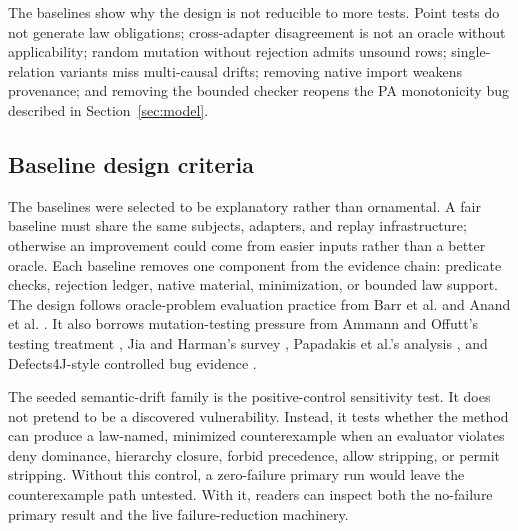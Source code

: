\documentclass[10pt,conference]{IEEEtran}
\begin{document}
The baselines show why the design is not reducible to more tests.  Point tests do not generate law obligations; cross-adapter disagreement is not an oracle without applicability; random mutation without rejection admits unsound rows; single-relation variants miss multi-causal drifts; removing native import weakens provenance; and removing the bounded checker reopens the PA monotonicity bug described in Section~\ref{sec:model}.


\subsection{Baseline design criteria}
The baselines were selected to be explanatory rather than ornamental.  A fair baseline must share the same subjects, adapters, and replay infrastructure; otherwise an improvement could come from easier inputs rather than a better oracle.  Each baseline removes one component from the evidence chain: predicate checks, rejection ledger, native material, minimization, or bounded law support.  The design follows oracle-problem evaluation practice from Barr et al. \cite{barr2015oracle} and Anand et al. \cite{anand2013orchestrated}.  It also borrows mutation-testing pressure from Ammann and Offutt's testing treatment \cite{ammann2016introduction}, Jia and Harman's survey \cite{jia2011mutation}, Papadakis et al.'s analysis \cite{papadakis2019mutation}, and Defects4J-style controlled bug evidence \cite{just2014mutants}.

The seeded semantic-drift family is the positive-control sensitivity test.  It does not pretend to be a discovered vulnerability.  Instead, it tests whether the method can produce a law-named, minimized counterexample when an evaluator violates deny dominance, hierarchy closure, forbid precedence, allow stripping, or permit stripping.  Without this control, a zero-failure primary run would leave the counterexample path untested.  With it, readers can inspect both the no-failure primary result and the live failure-reduction machinery.
\end{document}
